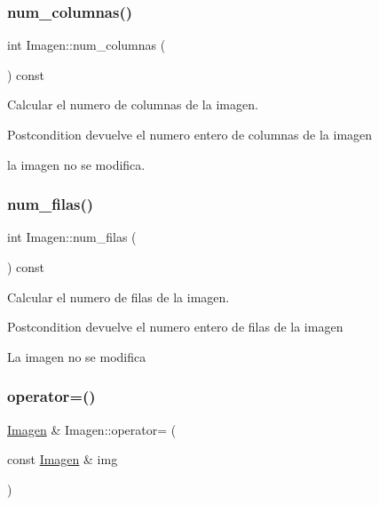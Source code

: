 \subsubsection{\texorpdfstring{num\+\_\+columnas()}{num\_columnas()}}
{\footnotesize\ttfamily int Imagen\+::num\+\_\+columnas (\begin{DoxyParamCaption}{ }\end{DoxyParamCaption}) const\hspace{0.3cm}{\ttfamily [inline]}}



Calcular el numero de columnas de la imagen. 

\begin{DoxyPostcond}{Postcondition}
devuelve el numero entero de columnas de la imagen 

la imagen no se modifica. 
\end{DoxyPostcond}
\mbox{\label{classImagen_a4cb4faa04f5e2913965e43a6a65acfd1}} 
\subsubsection{\texorpdfstring{num\+\_\+filas()}{num\_filas()}}
{\footnotesize\ttfamily int Imagen\+::num\+\_\+filas (\begin{DoxyParamCaption}{ }\end{DoxyParamCaption}) const\hspace{0.3cm}{\ttfamily [inline]}}



Calcular el numero de filas de la imagen. 

\begin{DoxyPostcond}{Postcondition}
devuelve el numero entero de filas de la imagen 

La imagen no se modifica 
\end{DoxyPostcond}
\mbox{\label{classImagen_a43d10ec74966d22e5477f686462802dc}} 
\subsubsection{\texorpdfstring{operator=()}{operator=()}}
{\footnotesize\ttfamily \hyperlink{classImagen}{Imagen} \& Imagen\+::operator= (\begin{DoxyParamCaption}\item[{const \hyperlink{classImagen}{Imagen} \&}]{img }\end{DoxyParamCaption})}



